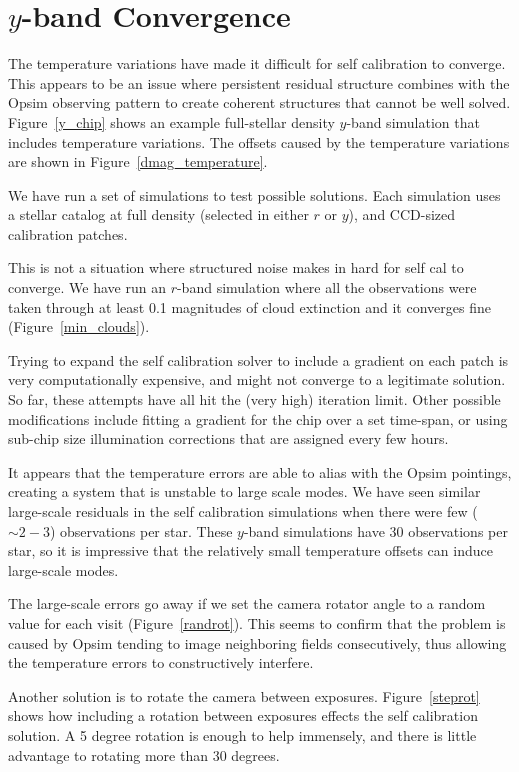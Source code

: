\section{$y$-band Convergence}
The temperature variations have made it difficult for self calibration to converge.  This appears to be an issue where persistent residual structure combines with the Opsim observing pattern to create coherent structures that cannot be well solved.  Figure~\ref{y_chip} shows an example full-stellar density $y$-band simulation that includes temperature variations.  The offsets caused by the temperature variations are shown in Figure~\ref{dmag_temperature}.  

We have run a set of simulations to test possible solutions.  Each simulation uses a stellar catalog at full density (selected in either $r$ or $y$), and CCD-sized calibration patches.  

This is not a situation where structured noise makes in hard for self cal to converge.  We have run an $r$-band simulation where all the observations were taken through at least 0.1 magnitudes of cloud extinction and it converges fine (Figure~\ref{min_clouds}).  

Trying to expand the self calibration solver to include a gradient on each patch is very computationally expensive, and might not converge to a legitimate solution.  So far, these attempts have all hit the (very high) iteration limit.  Other possible modifications include fitting a gradient for the chip over a set time-span, or using sub-chip size illumination corrections that are assigned every few hours.  

It appears that the temperature errors are able to alias with the Opsim pointings, creating a system that is unstable to large scale modes.  We have seen similar large-scale residuals in the self calibration simulations when there were few ($\sim2-3$) observations per star.  These $y$-band simulations have 30 observations per star, so it is impressive that the relatively small temperature offsets can induce large-scale modes.

The large-scale errors go away if we set the camera rotator angle to a random value for each visit (Figure~\ref{randrot}).  This seems to confirm that the problem is caused by Opsim tending to image neighboring fields consecutively, thus allowing the temperature errors to constructively interfere.  

Another solution is to rotate the camera between exposures.  Figure~\ref{steprot} shows how including a rotation between exposures effects the self calibration solution.  A 5 degree rotation is enough to help immensely, and there  is little advantage to rotating more than 30 degrees.

